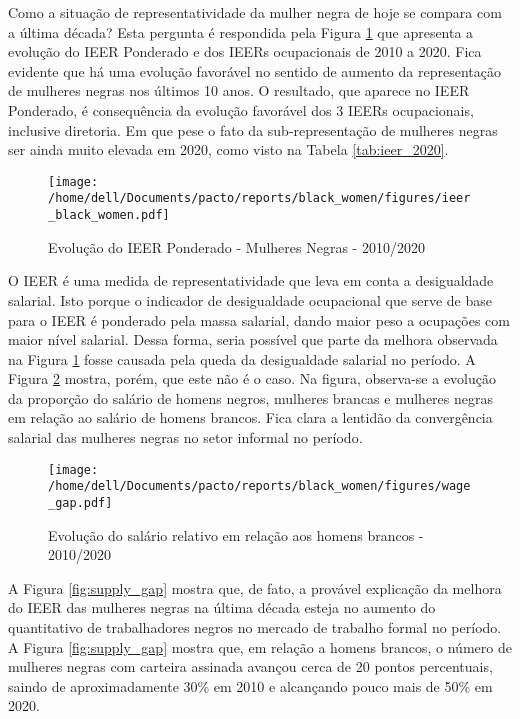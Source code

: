 \documentclass[12pt]{article}
\begin{document}
\par Como a situação de representatividade da mulher negra de hoje se compara com a última década? Esta pergunta é respondida pela Figura \ref{fig:ieer_evolution} que apresenta a evolução do IEER Ponderado e dos IEERs ocupacionais de 2010 a 2020. Fica evidente que há uma evolução favorável no sentido de aumento da representação de mulheres negras nos últimos 10 anos. O resultado, que aparece no IEER Ponderado, é consequência da evolução favorável dos 3 IEERs ocupacionais, inclusive diretoria. Em que pese o fato da sub-representação de mulheres negras ser ainda muito elevada em 2020, como visto na Tabela \ref{tab:ieer_2020}.

\begin{figure}[H]
    \centering
    \caption{Evolução do IEER Ponderado - Mulheres Negras - 2010/2020}
        \texttt{[image: /home/dell/Documents/pacto/reports/black\_women/figures/ieer\_black\_women.pdf]}
    \label{fig:ieer_evolution}
\end{figure}

\par O IEER é uma medida de representatividade que leva em conta a desigualdade salarial. Isto porque o indicador de desigualdade ocupacional que serve de base para o IEER é ponderado pela massa salarial, dando maior peso a ocupações com maior nível salarial. Dessa forma, seria possível que parte da melhora observada na Figura \ref{fig:ieer_evolution} fosse causada pela queda da desigualdade salarial no período. A Figura \ref{fig:wage_gap} mostra, porém, que este não é o caso. Na figura, observa-se a evolução da proporção do salário de homens negros, mulheres brancas e mulheres negras em relação ao salário de homens brancos. Fica clara a lentidão da convergência salarial das mulheres negras no setor informal no período.

\begin{figure}[H]
    \centering
    \caption{Evolução do salário relativo em relação aos homens brancos - 2010/2020}
        \texttt{[image: /home/dell/Documents/pacto/reports/black\_women/figures/wage\_gap.pdf]}
    \label{fig:wage_gap}
\end{figure}

\par A Figura \ref{fig:supply_gap} mostra que, de fato, a provável explicação da melhora do IEER das mulheres negras na última década esteja no aumento do quantitativo de trabalhadores negros no mercado de trabalho formal no período. A Figura \ref{fig:supply_gap} mostra que, em relação a homens brancos, o número de mulheres negras com carteira assinada avançou cerca de 20 pontos percentuais, saindo de aproximadamente 30\% em 2010 e alcançando pouco mais de 50\% em 2020.
\end{document}
